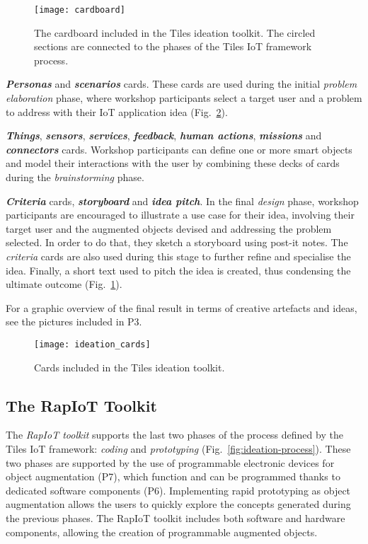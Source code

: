 \begin{figure}[ptb]
    \centering 
	\texttt{[image: cardboard]}
	\caption{The cardboard included in the Tiles ideation toolkit. The circled sections are connected to the phases of the Tiles IoT framework process.}
	\label{fig:cardboard}
\end{figure}


\textit{\textbf{Personas}} and \textit{\textbf{scenarios}} cards. These cards are used during the initial \textit{problem elaboration} phase, where workshop participants select a target user and a problem to address with their IoT application idea (Fig.~\ref{fig:cards}).

\textit{\textbf{Things}}, \textit{\textbf{sensors}}, \textit{\textbf{services}}, \textit{\textbf{feedback}}, \textit{\textbf{human actions}}, \textit{\textbf{missions}} and \textit{\textbf{connectors}} cards. Workshop participants can define one or more smart objects and model their interactions with the user by combining these decks of cards during the \textit{brainstorming} phase.

\textit{\textbf{Criteria}} cards, \textit{\textbf{storyboard}} and \textit{\textbf{idea pitch}}. In the final \textit{design} phase, workshop participants are encouraged to illustrate a use case for their idea, involving their target user and the augmented objects devised and addressing the problem selected. In order to do that, they sketch a storyboard using post-it notes. The \textit{criteria} cards are also used during this stage to further refine and specialise the idea. Finally, a short text used to pitch the idea is created, thus condensing the ultimate outcome (Fig.~\ref{fig:cardboard}).

For a graphic overview of the final result in terms of creative artefacts and ideas, see the pictures included in P3.

\begin{figure}[ptb]
    \centering 
	\texttt{[image: ideation\_cards]}
	\caption{Cards included in the Tiles ideation toolkit.}
	\label{fig:cards}
\end{figure}


\subsection{The RapIoT Toolkit}

The \textit{RapIoT toolkit} supports the last two phases of the process defined by the Tiles IoT framework: \textit{coding} and \textit{prototyping} (Fig.~\ref{fig:ideation-process}). These two phases are supported by the use of programmable electronic devices for object augmentation (P7), which function and can be programmed thanks to dedicated software components (P6). Implementing rapid prototyping as object augmentation allows the users to quickly explore the concepts generated during the previous phases. The RapIoT toolkit includes both software and hardware components, allowing the creation of programmable augmented objects.

